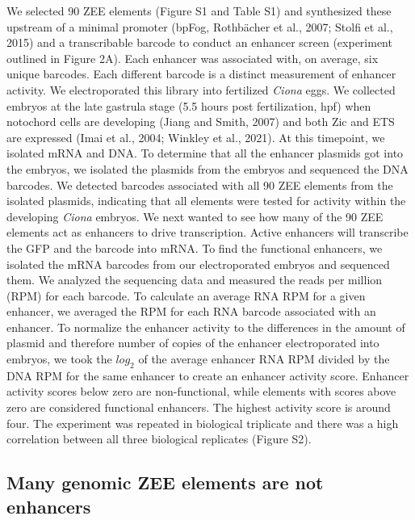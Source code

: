 We selected 90 ZEE elements (Figure S1 and Table S1) and synthesized these upstream of a minimal promoter (bpFog, Rothbächer et al., 2007; Stolfi et al., 2015) and a transcribable barcode to conduct an enhancer screen (experiment outlined in Figure 2A). Each enhancer was associated with, on average, six unique barcodes. Each different barcode is a distinct measurement of enhancer activity. We electroporated this library into fertilized \textit{Ciona} eggs. We collected embryos at the late gastrula stage (5.5 hours post fertilization, hpf) when notochord cells are developing (Jiang and Smith, 2007) and both Zic and ETS are expressed (Imai et al., 2004; Winkley et al., 2021). At this timepoint, we isolated mRNA and DNA. To determine that all the enhancer plasmids got into the embryos, we isolated the plasmids from the embryos and sequenced the DNA barcodes. We detected barcodes associated with all 90 ZEE elements from the isolated plasmids, indicating that all elements were tested for activity within the developing \textit{Ciona} embryos. 
We next wanted to see how many of the 90 ZEE elements act as enhancers to drive transcription. Active enhancers will transcribe the GFP and the barcode into mRNA. To find the functional enhancers, we isolated the mRNA barcodes from our electroporated embryos and sequenced them. We analyzed the sequencing data and measured the reads per million (RPM) for each barcode. To calculate an average RNA RPM for a given enhancer, we averaged the RPM for each RNA barcode associated with an enhancer. To normalize the enhancer activity to the differences in the amount of plasmid and therefore number of copies of the enhancer electroporated into embryos, we took the $log_2$ of the average enhancer RNA RPM divided by the DNA RPM for the same enhancer to create an enhancer activity score. Enhancer activity scores below zero are non-functional, while elements with scores above zero are considered functional enhancers. The highest activity score is around four. The experiment was repeated in biological triplicate and there was a high correlation between all three biological replicates (Figure S2).

\subsection{Many genomic ZEE elements are not enhancers}

